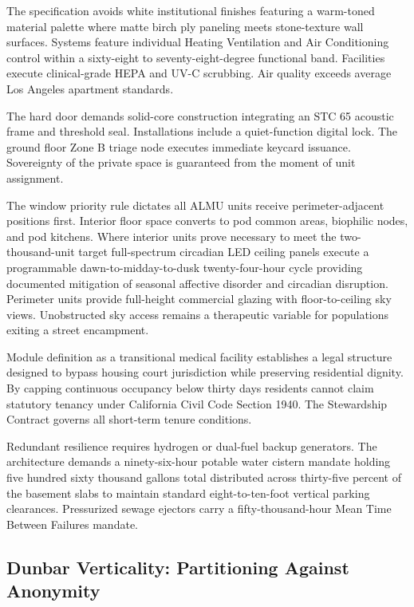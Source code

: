 \documentclass[12pt, letterpaper]{article}
\begin{document}
The specification avoids white institutional finishes featuring a warm-toned material palette where matte birch ply paneling meets stone-texture wall surfaces. Systems feature individual Heating Ventilation and Air Conditioning control within a sixty-eight to seventy-eight-degree functional band. Facilities execute clinical-grade HEPA and UV-C scrubbing. Air quality exceeds average Los Angeles apartment standards.

The hard door demands solid-core construction integrating an STC 65 acoustic frame and threshold seal. Installations include a quiet-function digital lock. The ground floor Zone B triage node executes immediate keycard issuance. Sovereignty of the private space is guaranteed from the moment of unit assignment.

The window priority rule dictates all ALMU units receive perimeter-adjacent positions first. Interior floor space converts to pod common areas, biophilic nodes, and pod kitchens. Where interior units prove necessary to meet the two-thousand-unit target full-spectrum circadian LED ceiling panels execute a programmable dawn-to-midday-to-dusk twenty-four-hour cycle providing documented mitigation of seasonal affective disorder and circadian disruption. Perimeter units provide full-height commercial glazing with floor-to-ceiling sky views. Unobstructed sky access remains a therapeutic variable for populations exiting a street encampment.

Module definition as a transitional medical facility establishes a legal structure designed to bypass housing court jurisdiction while preserving residential dignity. By capping continuous occupancy below thirty days residents cannot claim statutory tenancy under California Civil Code Section 1940. The Stewardship Contract governs all short-term tenure conditions.

Redundant resilience requires hydrogen or dual-fuel backup generators. The architecture demands a ninety-six-hour potable water cistern mandate holding five hundred sixty thousand gallons total distributed across thirty-five percent of the basement slabs to maintain standard eight-to-ten-foot vertical parking clearances. Pressurized sewage ejectors carry a fifty-thousand-hour Mean Time Between Failures mandate.

\subsection{Dunbar Verticality: Partitioning Against Anonymity}
\end{document}
